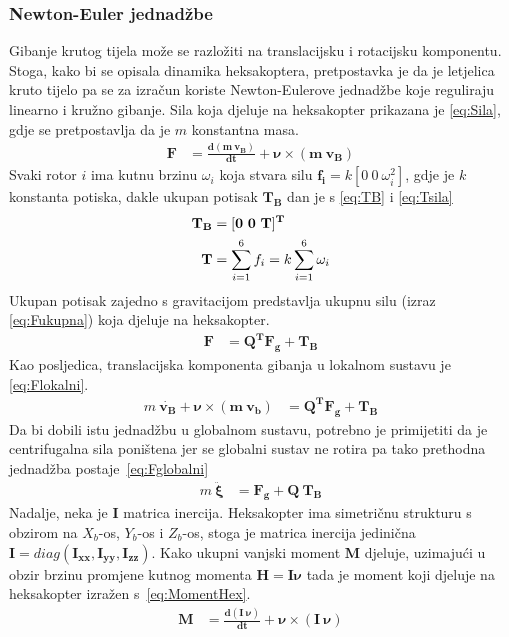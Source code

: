\documentclass[times, utf8, diplomski]{fer}
\begin{document}
\subsubsection{Newton-Euler jednadžbe}
Gibanje krutog tijela može se razložiti na translacijsku i rotacijsku komponentu. Stoga, kako bi se opisala dinamika heksakoptera, pretpostavka je da je letjelica kruto tijelo pa se za izračun koriste Newton-Eulerove jednadžbe koje reguliraju linearno i kružno gibanje. Sila koja djeluje na heksakopter prikazana je \ref{eq:Sila}, gdje se pretpostavlja da je $m$ konstantna masa.
\begin{align}
\mathbf{F}&=\mathbf{\frac{d(m~v_B)}{dt}+\nu\times (m~v_B)} \label{eq:Sila}
\end{align}
Svaki rotor $i$ ima kutnu brzinu $\omega_i$ koja stvara silu $\mathbf{f_i}=k[0 ~0 ~\omega^2_i]$, gdje je $k$ konstanta potiska, dakle ukupan potisak  $\mathbf{T_B}$ dan je s \ref{eq:TB} i \ref{eq:Tsila}
\begin{align}
\centering
\mathbf{T_B}&=\mathbf{[0 ~0 ~T]^T} \label{eq:TB} \\
\mathbf{T}&=\sum_{i=1}^{6}f_i=k\sum_{i=1}^{6}\omega_i \label{eq:Tsila}
\end{align}
Ukupan potisak zajedno s gravitacijom predstavlja ukupnu silu (izraz \ref{eq:Fukupna}) koja djeluje na heksakopter.
\begin{align}
\mathbf{F}&=\mathbf{Q^TF_g+T_B} \label{eq:Fukupna}
\end{align}
Kao posljedica, translacijska komponenta gibanja u lokalnom sustavu je \ref{eq:Flokalni}.
\begin{align}
m~\mathbf{\dot{v_B}+\nu\times (m~v_b)}&=\mathbf{Q^TF_g+T_B} \label{eq:Flokalni}
\end{align}
Da bi dobili istu jednadžbu u globalnom sustavu, potrebno je primijetiti da je centrifugalna sila poništena jer se globalni sustav ne rotira pa tako prethodna jednadžba postaje~\ref{eq:Fglobalni}
\begin{align}
m~\mathbf{\ddot{\xi}}&=\mathbf{F_g+Q~T_B} \label{eq:Fglobalni}
\end{align}
Nadalje, neka je $\mathbf{I}$ matrica inercija. Heksakopter ima simetričnu strukturu s obzirom na $X_b$-os, $Y_b$-os i $Z_b$-os, stoga je matrica inercija jedinična $\mathbf{I}=diag(\mathbf{I_{xx}, I_{yy}, I_{zz}})$. Kako ukupni vanjski moment $\mathbf{M}$ djeluje, uzimajući u obzir brzinu promjene kutnog momenta  $\mathbf{H=I\nu}$ tada je moment koji djeluje na heksakopter izražen s~\ref{eq:MomentHex}.
\begin{align}
\mathbf{M}&=\mathbf{\frac{d(I~\nu)}{dt}+\nu\times(I~\nu)} \label{eq:MomentHex}
\end{align}
\end{document}
